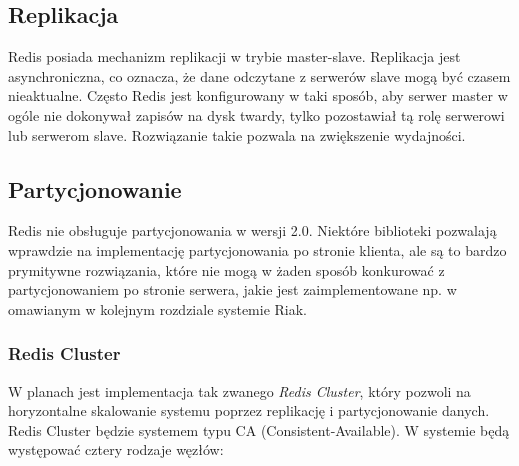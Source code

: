 \subsection*{Replikacja}

Redis posiada mechanizm replikacji w trybie master-slave.
Replikacja jest asynchroniczna, co oznacza, że dane odczytane z serwerów slave mogą być czasem nieaktualne.
Często Redis jest konfigurowany w taki sposób, aby serwer master w ogóle nie dokonywał zapisów na dysk twardy, tylko pozostawiał tą rolę serwerowi lub serwerom slave.
Rozwiązanie takie pozwala na zwiększenie wydajności.

\subsection*{Partycjonowanie}

Redis nie obsługuje partycjonowania w wersji 2.0.
Niektóre biblioteki pozwalają wprawdzie na implementację partycjonowania po stronie klienta, ale są to bardzo prymitywne rozwiązania, które nie mogą w żaden sposób konkurować z partycjonowaniem po stronie serwera, jakie jest zaimplementowane np. w omawianym w kolejnym rozdziale systemie Riak.

\subsubsection*{Redis Cluster}

W planach jest implementacja tak zwanego \emph{Redis Cluster}, który pozwoli na horyzontalne skalowanie systemu poprzez replikację i partycjonowanie danych.
Redis Cluster będzie systemem typu CA (Consistent-Available).
W systemie będą występować cztery rodzaje węzłów:

